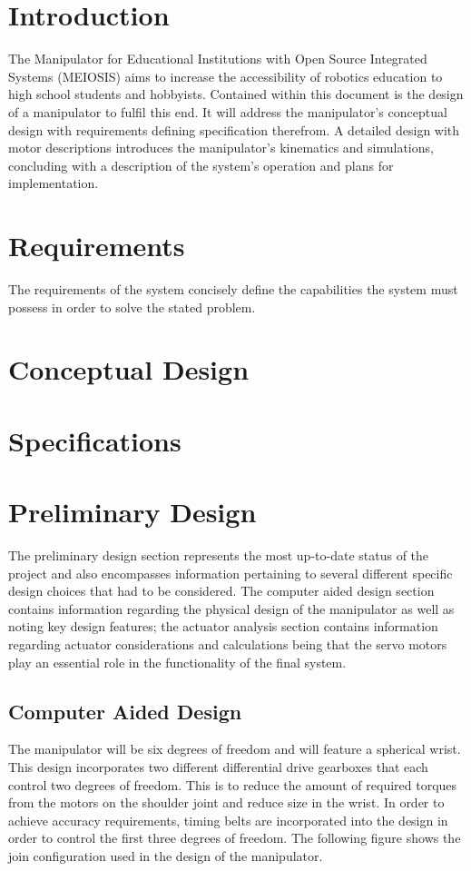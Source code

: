 \section{Introduction}
The Manipulator for Educational Institutions with Open Source Integrated Systems (MEIOSIS) aims to increase the accessibility of robotics education to high school students and hobbyists. Contained within this document is the design of a manipulator to fulfil this end. It will address the manipulator’s conceptual design with requirements defining specification therefrom. A detailed design with motor descriptions introduces the manipulator’s kinematics and simulations, concluding with a description of the system's operation and plans for implementation.
\section{Requirements}
The requirements of the system concisely define the capabilities the system must possess in order to solve the stated problem.

\newpage
\section{Conceptual Design}

\newpage
\section{Specifications}

\newpage
\section{Preliminary Design}
The preliminary design section represents the most up-to-date status of the project and also encompasses information pertaining to several different specific design choices that had to be considered. The computer aided design section contains information regarding the physical design of the manipulator as well as noting key design features; the actuator analysis section contains information regarding actuator considerations and calculations being that the servo motors play an essential role in the functionality of the final system.
\subsection{Computer Aided Design}
The manipulator will be six degrees of freedom and will feature a spherical wrist. This design incorporates two different differential drive gearboxes that each control two degrees of freedom. This is to reduce the amount of required torques from the motors on the shoulder joint and reduce size in the wrist. In order to achieve accuracy requirements, timing belts are incorporated into the design in order to control the first three degrees of freedom. The following figure shows the join configuration used in the design of the manipulator.

